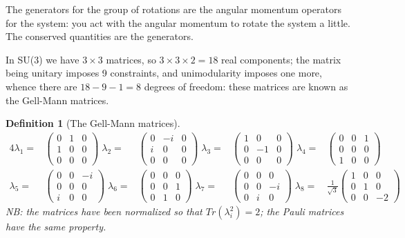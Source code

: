\documentclass[]{article}
\newtheorem{defn}[thm]{Definition}
\begin{document}
The generators for the group of rotations are the angular momentum operators for the system: you act with the angular momentum to rotate the system a little. The conserved quantities are the generators.

In SU(3) we have $3\times3$ matrices, so $3\times3\times2=18$ real components; the matrix being unitary imposes 9 constraints, and unimodularity imposes one more, whence there are $18-9-1=8$ degrees of freedom: these matrices are known as the Gell-Mann matrices.

\begin{defn}[The Gell-Mann matrices]
	\begin{alignat*}{4}
		\lambda_1=&\begin{pmatrix}
			0&1&0\\
			1&0&0\\
			0&0&0
		\end{pmatrix} \; \lambda_2=&\begin{pmatrix}
			0&-i&0\\
			i&0&0\\
			0&0&0
		\end{pmatrix}\;\lambda_3=&\begin{pmatrix}
			1&0&0\\
			0&-1&0\\
			0&0&0
		\end{pmatrix}\;	\lambda_4=&\begin{pmatrix}
			0&0&1\\
			0&0&0\\
			1&0&0
		\end{pmatrix}\\
		\lambda_5=&\begin{pmatrix}
			0&0&-i\\
			0&0&0\\
			i&0&0
		\end{pmatrix}\;	\lambda_6=&\begin{pmatrix}
			0&0&0\\
			0&0&1\\
			0&1&0
		\end{pmatrix} \;	\lambda_7=&\begin{pmatrix}
			0&0&0\\
			0&0&-i\\
			0&i&0
		\end{pmatrix} \;	\lambda_8=&\frac{1}{\sqrt{3}} \begin{pmatrix}
			1&0&0\\
			0&1&0\\
			0&0&-2
		\end{pmatrix}
	\end{alignat*}
	NB: the matrices have been normalized so that $Tr(\lambda_i^2)=2$; the Pauli matrices have the same property.
\end{defn}
\end{document}
